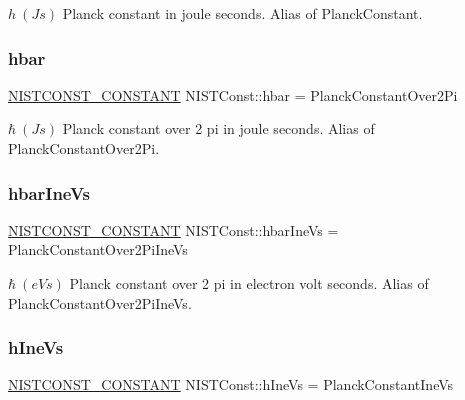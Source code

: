 $h \ (J s)$ Planck constant in joule seconds. Alias of Planck\+Constant. \mbox{\label{group___n_i_s_t_const-_planck_constant_ga60e6824bfbb9d7b1050439c6962e8be0}} 
\subsubsection{\texorpdfstring{hbar}{hbar}}
{\footnotesize\ttfamily \mbox{\hyperlink{group___n_i_s_t_const-_macros_ga2b0fc1d7452373f816175dd86ce26729}{N\+I\+S\+T\+C\+O\+N\+S\+T\+\_\+\+C\+O\+N\+S\+T\+A\+NT}} N\+I\+S\+T\+Const\+::hbar = Planck\+Constant\+Over2\+Pi}

$\hbar \ (J s)$ Planck constant over 2 pi in joule seconds. Alias of Planck\+Constant\+Over2\+Pi. \mbox{\label{group___n_i_s_t_const-_planck_constant_gaabd064b4a99463ee079bbd36e7234e51}} 
\subsubsection{\texorpdfstring{hbar\+Ine\+Vs}{hbarIneVs}}
{\footnotesize\ttfamily \mbox{\hyperlink{group___n_i_s_t_const-_macros_ga2b0fc1d7452373f816175dd86ce26729}{N\+I\+S\+T\+C\+O\+N\+S\+T\+\_\+\+C\+O\+N\+S\+T\+A\+NT}} N\+I\+S\+T\+Const\+::hbar\+Ine\+Vs = Planck\+Constant\+Over2\+Pi\+Ine\+Vs}

$\hbar \ (eV s)$ Planck constant over 2 pi in electron volt seconds. Alias of Planck\+Constant\+Over2\+Pi\+Ine\+Vs. \mbox{\label{group___n_i_s_t_const-_planck_constant_gada98075561307d5e40b086c0b0b21996}} 
\subsubsection{\texorpdfstring{h\+Ine\+Vs}{hIneVs}}
{\footnotesize\ttfamily \mbox{\hyperlink{group___n_i_s_t_const-_macros_ga2b0fc1d7452373f816175dd86ce26729}{N\+I\+S\+T\+C\+O\+N\+S\+T\+\_\+\+C\+O\+N\+S\+T\+A\+NT}} N\+I\+S\+T\+Const\+::h\+Ine\+Vs = Planck\+Constant\+Ine\+Vs}

